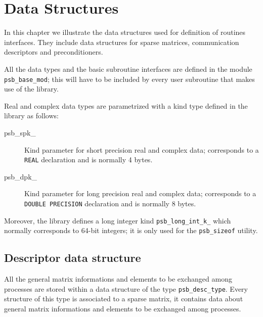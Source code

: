 \section{Data Structures}
\label{sec:datastruct}

In this chapter we  illustrate the  data structures used for definition of
routines interfaces. They  include data structures for sparse matrices,
communication descriptors and preconditioners.%

All the data types and the basic subroutine interfaces are defined in
the module \verb|psb_base_mod|; this will have to be included by every
user subroutine that makes use of the library. 

Real and complex data types are parametrized with a kind type defined
in the library as follows: 
\begin{description}
\item[psb\_spk\_] Kind parameter for short precision real and complex
  data; corresponds to a \verb|REAL| declaration and is
  normally 4 bytes. 
\item[psb\_dpk\_] Kind parameter for long precision real and complex
  data; corresponds to a \verb|DOUBLE PRECISION| declaration and is
  normally 8 bytes. 
\end{description}
Moreover, the library defines a long integer kind
\verb|psb_long_int_k_| which normally corresponds to 64-bit integers;
it is only used for the \verb|psb_sizeof| utility. 



\subsection{Descriptor data structure}
\label{sec:desc}
All the general matrix informations and elements to be
exchanged among processes are stored within a data structure of the
type \hypertarget{descdata}{{\tt psb\_desc\_type}}. 
Every structure of this type is associated to a sparse matrix, it
contains data about general matrix informations and elements to be
exchanged among processes.  

